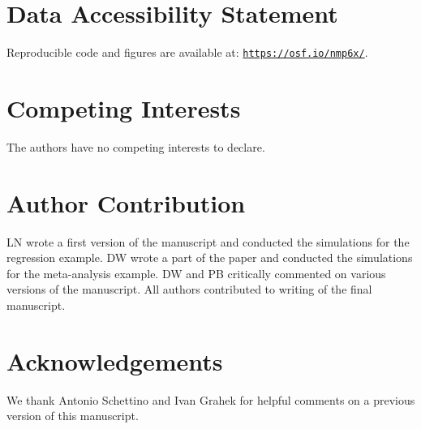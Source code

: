 \documentclass[a4paper,man,natbib,floatsintext,donotrepeattitle]{apa6}
\begin{document}
\section{Data Accessibility Statement}

Reproducible code and figures are available at: \href{https://osf.io/nmp6x/}{\nolinkurl{https://osf.io/nmp6x/}}.

\section{Competing Interests}

The authors have no competing interests to declare.

\section{Author Contribution}

LN wrote a first version of the manuscript and conducted the simulations for the regression example. DW wrote a part of the paper and conducted the simulations for the meta-analysis example. DW and PB critically commented on various versions of the manuscript. All authors contributed to writing of the final manuscript.

\section{Acknowledgements}

We thank Antonio Schettino and Ivan Grahek for helpful comments on a previous version of this manuscript.


\end{document}
